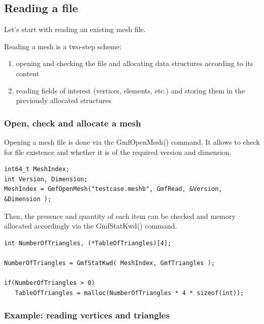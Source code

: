\documentclass[a4paper,12pt]{article}
\begin{document}
\subsection{Reading a file}

Let's start with reading an existing mesh file.

Reading a mesh is a two-step scheme:

\begin{enumerate}
\item opening and checking the file and allocating data structures according to its content
\item reading fields of interest (vertices, elements, etc.) and storing them in the previously allocated structures
\end{enumerate}

\subsubsection{Open, check and allocate a mesh}

Opening a mesh file is done via the GmfOpenMesh() command. It allows to check for file existence and whether it is of the required version and dimension.

\begin{tt}
\begin{verbatim}
int64_t MeshIndex;
int Version, Dimension;
MeshIndex = GmfOpenMesh("testcase.meshb", GmfRead, &Version, &Dimension );
\end{verbatim}
\end{tt}
\normalfont

Then, the presence and quantity of each item can be checked and memory allocated accordingly via the GmfStatKwd() command.

\begin{tt}
\begin{verbatim}
int NumberOfTriangles, (*TableOfTriangles)[4];

NumberOfTriangles = GmfStatKwd( MeshIndex, GmfTriangles );

if(NumberOfTriangles > 0)
   TableOfTriangles = malloc(NumberOfTriangles * 4 * sizeof(int));
\end{verbatim}
\end{tt}
\normalfont


\subsubsection{Example: reading vertices and triangles}
\end{document}
